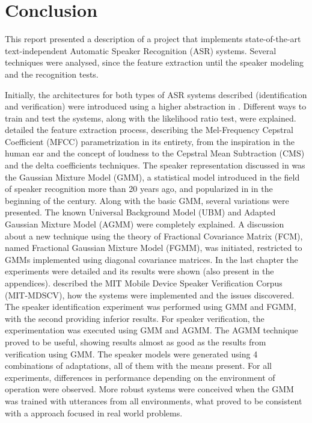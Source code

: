 \chapter{Conclusion}
\label{ch:conclusion}

This report presented a description of a project that implements state-of-the-art text-independent Automatic Speaker Recognition (ASR) systems. Several techniques were analysed, since the feature extraction until the speaker modeling and the recognition tests.

Initially, the architectures for both types of ASR systems described (identification and verification) were introduced using a higher abstraction in . Different ways to train and test the systems, along with the likelihood ratio test, were explained.  detailed the feature extraction process, describing the Mel-Frequency Cepstral Coefficient (MFCC) parametrization in its entirety, from the inspiration in the human ear and the concept of loudness to the Cepstral Mean Subtraction (CMS) and the delta coefficients techniques. The speaker representation discussed in  was the Gaussian Mixture Model (GMM), a statistical model introduced in the field of speaker recognition more than 20 years ago, and popularized in in the beginning of the century. Along with the basic GMM, several variations were presented. The known Universal Background Model (UBM) and Adapted Gaussian Mixture Model (AGMM) were completely explained. A discussion about a new technique using the theory of Fractional Covariance Matrix (FCM), named Fractional Gaussian Mixture Model (FGMM), was initiated, restricted to GMMs implemented using diagonal covariance matrices. In the last chapter the experiments were detailed and its results were shown (also present in the appendices).  described the MIT Mobile Device Speaker Verification Corpus (MIT-MDSCV), how the systems were implemented and the issues discovered. The speaker identification experiment was performed using GMM and FGMM, with the second providing inferior results. For speaker verification, the experimentation was executed using GMM and AGMM. The AGMM technique proved to be useful, showing results almost as good as the results from verification using GMM. The speaker models were generated using 4 combinations of adaptations, all of them with the means present. For all experiments, differences in performance depending on the environment of operation were observed. More robust systems were conceived when the GMM was trained with utterances from all environments, what proved to be consistent with a approach focused in real world problems.

